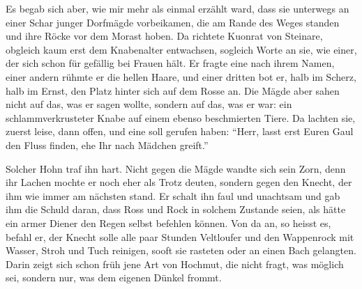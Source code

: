 Es begab sich aber, wie mir mehr als einmal erzählt ward, dass sie unterwegs an einer Schar junger Dorfmägde vorbeikamen, die am Rande des Weges standen und ihre Röcke vor dem Morast hoben. Da richtete \gls{Kuonrat von Steinare}, obgleich kaum erst dem Knabenalter entwachsen, sogleich Worte an sie, wie einer, der sich schon für gefällig bei Frauen hält. Er fragte eine nach ihrem Namen, einer andern rühmte er die hellen Haare, und einer dritten bot er, halb im Scherz, halb im Ernst, den Platz hinter sich auf dem Rosse an. Die Mägde aber sahen nicht auf das, was er sagen wollte, sondern auf das, was er war: ein schlammverkrusteter Knabe auf einem ebenso beschmierten Tiere. Da lachten sie, zuerst leise, dann offen, und eine soll gerufen haben: \enquote{Herr, lasst erst Euren Gaul den Fluss finden, ehe Ihr nach Mädchen greift.}

Solcher Hohn traf ihn hart. Nicht gegen die Mägde wandte sich sein Zorn, denn ihr Lachen mochte er noch eher als Trotz deuten, sondern gegen den \gls{Knecht}, der ihm wie immer am nächsten stand. Er schalt ihn faul und unachtsam und gab ihm die Schuld daran, dass Ross und Rock in solchem Zustande seien, als hätte ein armer Diener den Regen selbst befehlen können. Von da an, so heisst es, befahl er, der \gls{Knecht} solle alle paar Stunden \gls{Veltloufer} und den Wappenrock mit Wasser, Stroh und Tuch reinigen, sooft sie rasteten oder an einen Bach gelangten. Darin zeigt sich schon früh jene Art von Hochmut, die nicht fragt, was möglich sei, sondern nur, was dem eigenen Dünkel frommt.